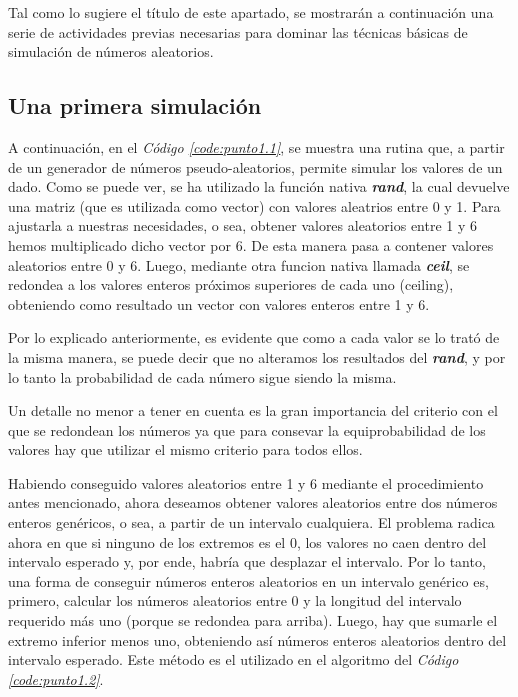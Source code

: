 \documentclass{article}
\newcommand{\refcode}[1]{\textit{Código \ref{#1}}}
\begin{document}
Tal como lo sugiere el título de este apartado, se mostrarán a continuación una serie de actividades previas necesarias para dominar las técnicas básicas de simulación de números aleatorios.


\subsection{Una primera simulación}

A continuación, en el \refcode{code:punto1.1}, se muestra una rutina que, a partir de un generador de números pseudo-aleatorios, permite simular los valores de un dado. Como se puede ver, se ha utilizado la función nativa \textbf{\textit{rand}}, la cual devuelve una matriz (que es utilizada como vector) con valores aleatrios entre 0 y 1. Para ajustarla a nuestras necesidades, o sea, obtener valores aleatorios entre 1 y 6 hemos multiplicado dicho vector por 6. De esta manera pasa a contener valores aleatorios entre 0 y 6. Luego, mediante otra funcion nativa llamada \textbf{\textit{ceil}}, se redondea a los valores enteros próximos superiores de cada uno (ceiling), obteniendo como resultado un vector con valores enteros entre 1 y 6. 



\medskip
\par
Por lo explicado anteriormente, es evidente que como a cada valor se lo trató de la misma manera, se puede decir que no alteramos los resultados del \textbf{\textit{rand}}, y por lo tanto la probabilidad de cada número sigue siendo la misma.
	\par
	Un detalle no menor a tener en cuenta es la gran importancia del criterio con el que se redondean los números ya que para consevar la equiprobabilidad de los valores hay que utilizar el mismo criterio para todos ellos.
	\par
	Habiendo conseguido valores aleatorios entre 1 y 6 mediante el procedimiento antes mencionado, ahora deseamos obtener valores aleatorios entre dos números enteros genéricos, o sea, a partir de un intervalo cualquiera. El problema radica ahora en que si ninguno de los extremos es el 0, los valores no caen dentro del intervalo esperado y, por ende, habría que desplazar el intervalo. Por lo tanto, una forma de conseguir números enteros aleatorios en un intervalo genérico es, primero, calcular los números aleatorios entre 0 y la longitud del intervalo requerido más uno (porque se redondea para arriba). Luego, hay que sumarle el extremo inferior menos uno, obteniendo así números enteros aleatorios dentro del intervalo esperado. Este método es el utilizado en el algoritmo del \refcode{code:punto1.2}.
\end{document}
